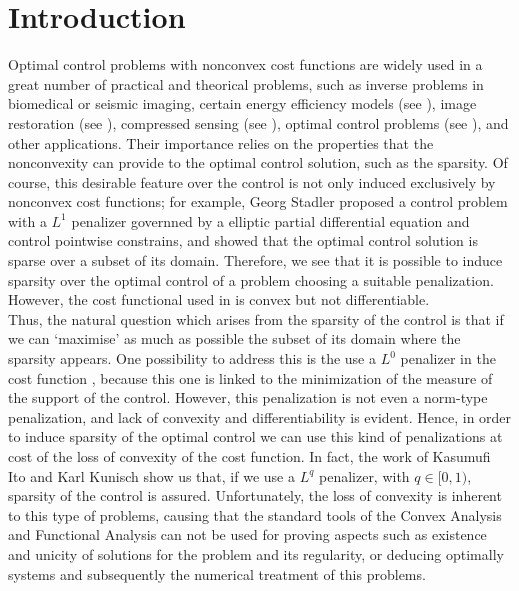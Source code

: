 \chapter*{Introduction}

Optimal control problems with nonconvex cost functions are widely used in a great number of practical and theorical problems, such as inverse problems in biomedical or seismic imaging, certain energy efficiency models (see \cite{vogel}), image restoration (see \cite{hintermueller}), compressed sensing (see \cite{foucart}), optimal control problems (see \cite{casas}), and other applications. Their importance relies on the properties that the nonconvexity can provide to the optimal control solution, such as the sparsity. Of course, this desirable feature over the control is not only induced exclusively by nonconvex cost functions; for example, Georg Stadler \cite{stadler2006} proposed a control problem with a $L^1$ penalizer governned by a elliptic partial differential equation and control pointwise constrains, and showed that the optimal control solution is sparse over a subset of its domain. Therefore, we see that it is possible to induce sparsity over the optimal control of a problem choosing a suitable penalization. However, the cost functional used in \cite{stadler2006} is convex but not differentiable.\\

Thus, the natural question which arises from the sparsity of the control is that if we can `maximise' as much as possible the subset of its domain where the sparsity appears. One possibility to address this is the use a $L^0$ penalizer in the cost function \cite{ito-kunisch2014}, because this one is linked to the minimization of the measure of the support of the control. However, this penalization is not even a norm-type penalization, and lack of convexity and differentiability is evident. Hence, in order to induce sparsity of the optimal control we can use this kind of penalizations at cost of the loss of convexity of the cost function. In fact, the work of Kasumufi Ito and Karl Kunisch \cite{ito-kunisch2014} show us that, if we use a $L^q$ penalizer, with $q\in [0,1)$, sparsity of the control is assured. Unfortunately, the loss of convexity is inherent to this type of problems, causing that the standard tools of the Convex Analysis and Functional Analysis can not be used for proving aspects such as existence and unicity of solutions for the problem and its regularity, or deducing optimally systems and subsequently the numerical treatment of this problems. \\

